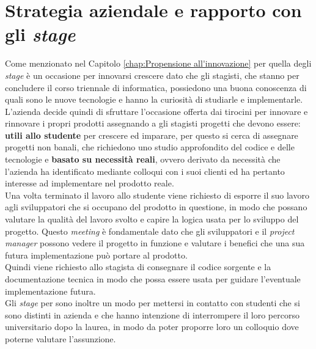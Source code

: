 \section{Strategia aziendale e rapporto con gli \textit{stage}}\label{chap:strategia}
Come menzionato nel Capitolo \ref{chap:Propensione all'innovazione} per {\company} quella degli \textit{stage} è un occasione 
per innovarsi crescere dato che gli stagisti, che stanno per concludere il corso triennale di informatica, possiedono una 
buona conoscenza di quali sono le nuove tecnologie e hanno la curiosità di studiarle e implementarle.\\
L'azienda decide quindi di sfruttare l'occasione offerta dai tirocini per innovare e rinnovare i propri prodotti 
assegnando a gli stagisti progetti che devono essere: 
\textbf{utili allo studente} per crescere ed imparare, per questo 
si cerca di assegnare progetti non banali, che richiedono uno studio approfondito del codice e delle tecnologie e 
\textbf{basato su necessità reali}, ovvero derivato da 
necessità che l'azienda ha identificato mediante colloqui con i suoi clienti ed ha pertanto 
interesse ad implementare nel prodotto reale.\\
Una volta terminato il lavoro allo studente viene richiesto di esporre il suo lavoro agli sviluppatori che si occupano 
del prodotto in questione, in modo che possano valutare la qualità del lavoro svolto e capire la logica usata per lo sviluppo 
del progetto. Questo \textit{meeting} è fondamentale dato che gli sviluppatori e il \textit{project manager} possono 
vedere il progetto in funzione e valutare i benefici che una sua futura implementazione può portare al prodotto.\\
Quindi viene richiesto allo stagista di consegnare il codice sorgente e la documentazione tecnica in modo che possa essere usata per guidare 
l'eventuale implementazione futura.\\
Gli \textit{stage} per {\company} sono inoltre un modo per mettersi in contatto con studenti che si sono distinti in azienda e che hanno 
intenzione di interrompere il loro percorso universitario dopo la laurea, in modo da poter proporre loro un colloquio 
dove poterne valutare l'assunzione.